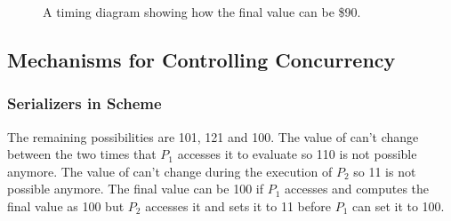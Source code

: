 \begin{exe}[3.38]
\begin{figure}
        \caption{A timing diagram showing how the final value can be \$90.}
        \label{3.38.2}
    \end{figure}
\end{exe}

\subsection{Mechanisms for Controlling Concurrency}

\subsubsection{Serializers in Scheme}

\begin{exe}[3.39]
    The remaining possibilities are 101, 121 and 100. The value of  
    can’t change between the two times that $P_1$ accesses it to evaluate
     so 110 is not possible anymore. The value of  can’t 
    change during the execution of $P_2$ so 11 is not possible anymore. The 
    final value can be 100 if $P_1$ accesses  and computes the final 
    value as 100 but $P_2$ accesses it and sets it to 11 before $P_1$ can set it 
    to 100.
\end{exe}

